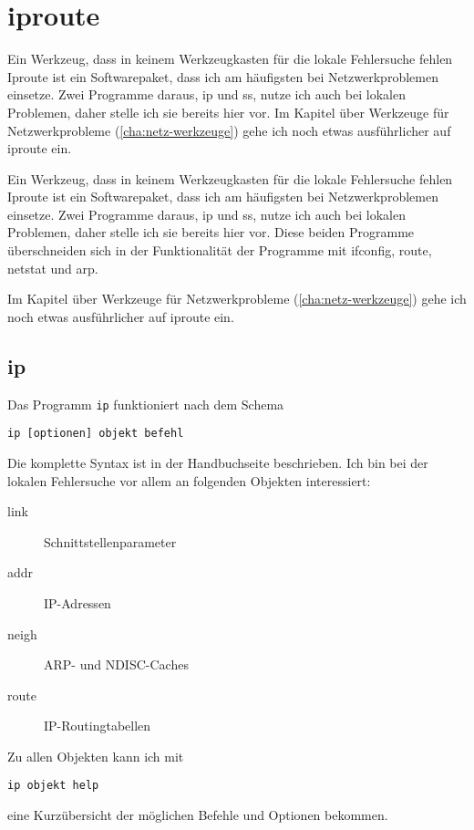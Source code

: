 \section{iproute}
\label{sec:lokal-werkzeuge-iproute}
\begin{abstractsec}
  Ein Werkzeug, dass in keinem Werkzeugkasten für die lokale Fehlersuche fehlen
  Iproute ist ein Softwarepaket, dass ich am häufigsten bei Netzwerkproblemen
  einsetze. Zwei Programme daraus, ip und ss, nutze ich auch bei lokalen
  Problemen, daher stelle ich sie bereits hier vor. Im Kapitel über Werkzeuge
  für Netzwerkprobleme (\ref{cha:netz-werkzeuge}) gehe ich noch etwas
  ausführlicher auf iproute ein.
\end{abstractsec}
\begin{normaltext}
  Ein Werkzeug, dass in keinem Werkzeugkasten für die lokale Fehlersuche fehlen
  Iproute ist ein Softwarepaket, dass ich am häufigsten bei Netzwerkproblemen
  einsetze. Zwei Programme daraus, ip und ss, nutze ich auch bei lokalen
  Problemen, daher stelle ich sie bereits hier vor. Diese beiden Programme
  überschneiden sich in der Funktionalität der Programme mit ifconfig, route,
  netstat und arp.
  
  Im Kapitel über Werkzeuge
  für Netzwerkprobleme (\ref{cha:netz-werkzeuge}) gehe ich noch etwas
  ausführlicher auf iproute ein. 

  \subsection*{ip}

  Das Programm \verb?ip? funktioniert nach dem Schema
  \begin{verbatim}
ip [optionen] objekt befehl
  \end{verbatim}
  Die komplette Syntax ist in der Handbuchseite beschrieben. Ich bin bei der
  lokalen Fehlersuche vor allem an folgenden Objekten interessiert:
  \begin{description}
    \item[link] Schnittstellenparameter
    \item[addr] IP-Adressen
    \item[neigh] ARP- und NDISC-Caches
    \item[route] IP-Routingtabellen
  \end{description}
  Zu allen Objekten kann ich mit
  \begin{verbatim}
ip objekt help
  \end{verbatim}
  eine Kurzübersicht der möglichen Befehle und Optionen bekommen.


\end{normaltext}
